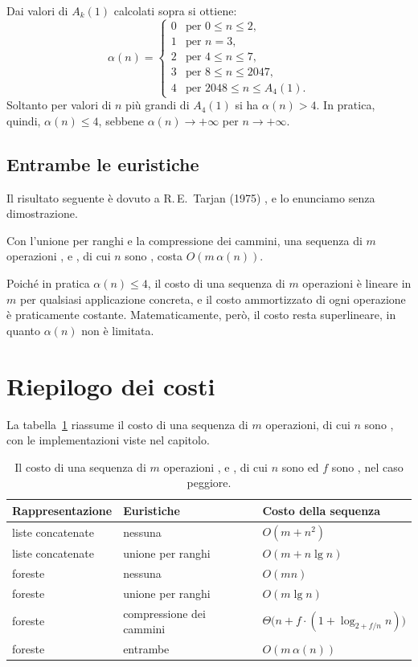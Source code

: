 Dai valori di $A_k(1)$ calcolati sopra si ottiene:
\[
\alpha(n) =
\begin{cases}
0 & \text{per } 0 \le n \le 2, \\
1 & \text{per } n = 3, \\
2 & \text{per } 4 \le n \le 7, \\
3 & \text{per } 8 \le n \le 2047, \\
4 & \text{per } 2048 \le n \le A_4(1).
\end{cases}
\]
Soltanto per valori di $n$ più grandi di $A_4(1)$ si ha $\alpha(n) > 4$. In pratica, quindi, $\alpha(n) \le 4$, sebbene $\alpha(n) \to +\infty$ per $n \to +\infty$.

\subsection{Entrambe le euristiche}\label{sec:uf-entrambe}
Il risultato seguente è dovuto a R.\,E.~Tarjan (1975) \cite{Tarjan1975}, e lo enunciamo senza dimostrazione.

\begin{teorema}\label{teo:uf-alpha}
Con l'unione per ranghi e la compressione dei cammini, una sequenza di $m$ operazioni \MakeSet{}, \Union{} e \FindSet{}, di cui $n$ sono \MakeSet{}, costa $O(m\,\alpha(n))$.
\end{teorema}

Poiché in pratica $\alpha(n) \le 4$, il costo di una sequenza di $m$ operazioni è lineare in $m$ per qualsiasi applicazione concreta, e il costo ammortizzato di ogni operazione è praticamente costante. Matematicamente, però, il costo resta superlineare, in quanto $\alpha(n)$ non è limitata.

\section{Riepilogo dei costi}\label{sec:uf-costi}
La tabella~\ref{tab:uf-costi} riassume il costo di una sequenza di $m$ operazioni, di cui $n$ sono \MakeSet{}, con le implementazioni viste nel capitolo.

\begin{table}[htbp]
\centering
\small
\begin{tabular}{lll}
\toprule
Rappresentazione & Euristiche & Costo della sequenza \\
\midrule
liste concatenate & nessuna & $O(m + n^2)$ \\
liste concatenate & unione per ranghi & $O(m + n \lg n)$ \\
foreste & nessuna & $O(m n)$ \\
foreste & unione per ranghi & $O(m \lg n)$ \\
foreste & compressione dei cammini & $\Theta\bigl(n + f \cdot (1 + \log_{2+f/n} n)\bigr)$ \\
foreste & entrambe & $O(m\,\alpha(n))$ \\
\bottomrule
\end{tabular}
\caption{Il costo di una sequenza di $m$ operazioni \MakeSet{}, \Union{} e \FindSet{}, di cui $n$ sono \MakeSet{} ed $f$ sono \FindSet{}, nel caso peggiore.}
\label{tab:uf-costi}
\end{table}

